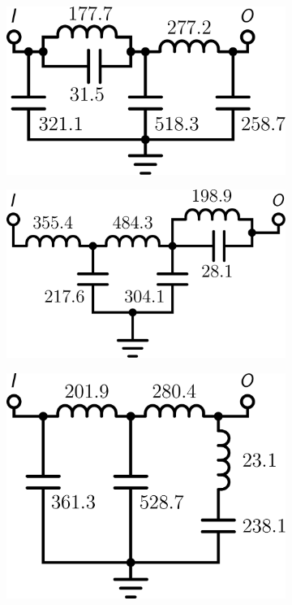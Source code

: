 \begin{figure}
\centering
\begin{subfigure}[t]{0.25\textwidth}
\centering
\includegraphics[scale = 0.14]{../ch6/figures/lpf3_circuit1}
\caption{\label{fig:lpf3_circuita}}
\end{subfigure}%
\begin{subfigure}[t]{0.25\textwidth}
\centering
\includegraphics[scale = 0.14]{../ch6/figures/lpf3_circuit2}
\caption{\label{fig:lpf3_circuitb}}
\end{subfigure}%
\begin{subfigure}[t]{0.25\textwidth}
\centering
\includegraphics[scale = 0.14]{../ch6/figures/lpf3_circuit3}

\end{subfigure}
\end{figure}
